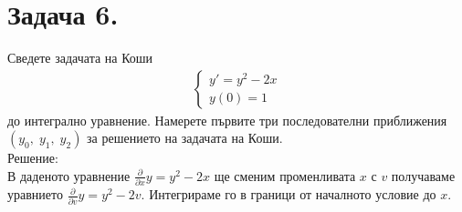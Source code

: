\documentclass[a4paper, 12pt, oneside]{article}
\begin{document}
\section{Задача 6.}
Сведете задачата на Коши
\begin{align*}
    \begin{cases}
        y' = y^2 - 2x \\
        y(0) = 1
    \end{cases}
\end{align*}
до интегрално уравнение. Намерете първите три последователни
приближения $(y_0, \; y_1, \; y_2)$ за решението на задачата на Коши. \\

Решение: \\

В даденото уравнение $\frac{\partial}{\partial x} y = y^2 - 2x$ ще сменим променливата $x$ с $v$
получаваме уравнието $\frac{\partial}{\partial v} y = y^2 - 2v$. Интегрираме го в граници от началното условие до $x$.
\end{document}
